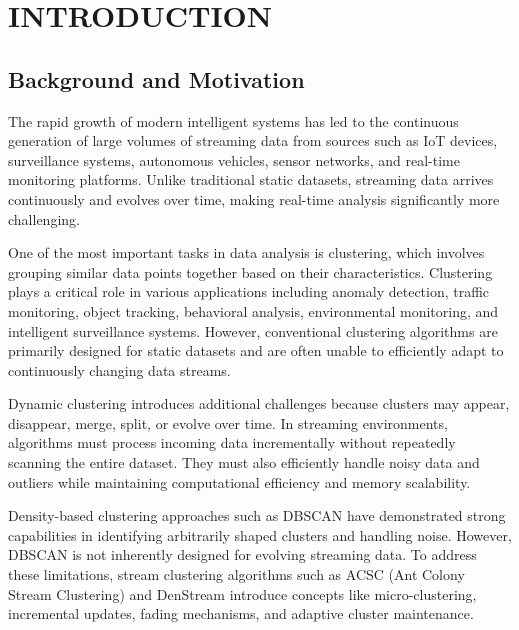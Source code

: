 \documentclass[12pt,a4paper]{report}
\begin{document}
\tableofcontents
\newpage


\chapter{INTRODUCTION}

\section{Background and Motivation}

The rapid growth of modern intelligent systems has led to the continuous generation of large volumes of streaming data from sources such as IoT devices, surveillance systems, autonomous vehicles, sensor networks, and real-time monitoring platforms. Unlike traditional static datasets, streaming data arrives continuously and evolves over time, making real-time analysis significantly more challenging.

One of the most important tasks in data analysis is clustering, which involves grouping similar data points together based on their characteristics. Clustering plays a critical role in various applications including anomaly detection, traffic monitoring, object tracking, behavioral analysis, environmental monitoring, and intelligent surveillance systems. However, conventional clustering algorithms are primarily designed for static datasets and are often unable to efficiently adapt to continuously changing data streams.

Dynamic clustering introduces additional challenges because clusters may appear, disappear, merge, split, or evolve over time. In streaming environments, algorithms must process incoming data incrementally without repeatedly scanning the entire dataset. They must also efficiently handle noisy data and outliers while maintaining computational efficiency and memory scalability.

Density-based clustering approaches such as DBSCAN have demonstrated strong capabilities in identifying arbitrarily shaped clusters and handling noise. However, DBSCAN is not inherently designed for evolving streaming data. To address these limitations, stream clustering algorithms such as ACSC (Ant Colony Stream Clustering) and DenStream introduce concepts like micro-clustering, incremental updates, fading mechanisms, and adaptive cluster maintenance.
\end{document}
